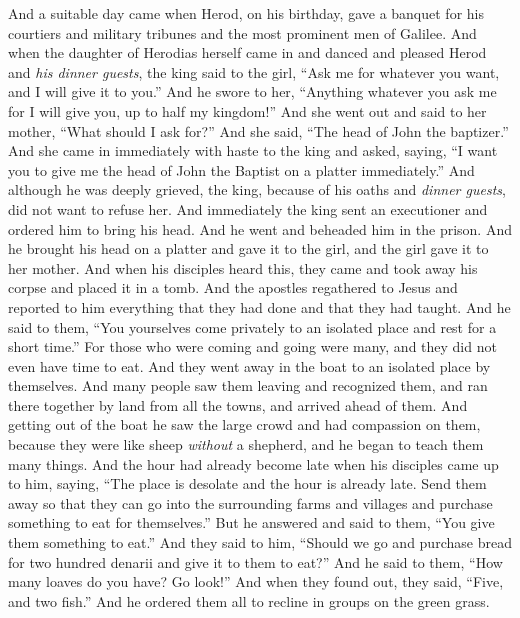 \begin{biblechapter}
\verse And a suitable day came when Herod, on his birthday, gave a banquet for his courtiers and military tribunes and the most prominent men of Galilee.
\verse And when the daughter of Herodias herself came in and danced and pleased Herod and \textit{his dinner guests}, the king said to the girl, “Ask me for whatever you want, and I will give it to you.”
\verse And he swore to her, “Anything whatever you ask me for I will give you, up to half my kingdom!”
\verse And she went out and said to her mother, “What should I ask for?” And she said, “The head of John the baptizer.”
\verse And she came in immediately with haste to the king and asked, saying, “I want you to give me the head of John the Baptist on a platter immediately.”
\verse And although he was deeply grieved, the king, because of his oaths and \textit{dinner guests}, did not want to refuse her.
\verse And immediately the king sent an executioner and ordered him to bring his head. And he went and beheaded him in the prison.
\verse And he brought his head on a platter and gave it to the girl, and the girl gave it to her mother.
\verse And when his disciples heard this, they came and took away his corpse and placed it in a tomb.
 And the apostles regathered to Jesus and reported to him everything that they had done and that they had taught.
\verse And he said to them, “You yourselves come privately to an isolated place and rest for a short time.” For those who were coming and going were many, and they did not even have time to eat.
\verse And they went away in the boat to an isolated place by themselves.
\verse And many people saw them leaving and recognized them, and ran there together by land from all the towns, and arrived ahead of them.
\verse And getting out of the boat he saw the large crowd and had compassion on them, because they were like sheep \textit{without} a shepherd, and he began to teach them many things.
\verse And the hour had already become late when his disciples came up to him, saying, “The place is desolate and the hour is already late.
\verse Send them away so that they can go into the surrounding farms and villages and purchase something to eat for themselves.”
\verse But he answered and said to them, “You give them something to eat.” And they said to him, “Should we go and purchase bread for two hundred denarii and give it to them to eat?”
\verse And he said to them, “How many loaves do you have? Go look!” And when they found out, they said, “Five, and two fish.”
\verse And he ordered them all to recline in groups on the green grass.

\end{biblechapter}
